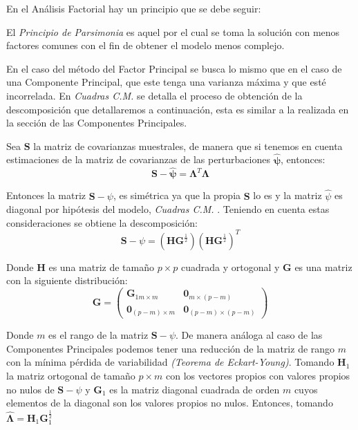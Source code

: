 \noindent En el Análisis Factorial hay un principio que se debe seguir:
\begin{defi}
El \emph{Principio de Parsimonia} es aquel por el cual se toma la solución con menos factores comunes con el fin de obtener el modelo menos complejo. 
\end{defi}

\noindent En el caso del método del Factor Principal se busca lo mismo que en el caso de una Componente Principal, que este tenga una varianza máxima y que esté incorrelada. En \emph{Cuadras C.M.}\cite{Cuadras 2014} se detalla el proceso de obtención de la descomposición que detallaremos a continuación, esta es similar a la realizada en la sección de las Componentes Principales. 

\noindent Sea $\mathbf{S}$ la matriz de covarianzas muestrales, de manera que si tenemos en cuenta estimaciones de la matriz de covarianzas de las perturbaciones $\mathbf{\hat{\psi}}$, entonces: 
\begin{equation}
\mathbf{S}-\mathbf{\hat{\psi}}=\mathbf{\Lambda}^T\mathbf{\Lambda}
\end{equation}

\noindent Entonces la matriz $\textbf{S}-\psi$, es simétrica ya que la propia $\textbf{S}$ lo es y la matriz $\hat{\psi}$ es diagonal por hipótesis del modelo, \emph{Cuadras C.M.} \cite{Cuadras 2014}. Teniendo en cuenta estas consideraciones se obtiene la descomposición:
\begin{equation}
\textbf{S}-\psi=(\textbf{HG}^{\frac{1}{2}})(\textbf{HG}^{\frac{1}{2}})^T
\end{equation}

\noindent Donde $\textbf{H}$ es una matriz de tamaño $p\times p$ cuadrada y ortogonal y $\textbf{G}$ es una matriz con la siguiente distribución:
\begin{equation}
\textbf{G}=\left(
\begin{matrix}
\textbf{G}_{1 m\times m} & \mathbf{0}_{m\times(p-m)}\\
\mathbf{0}_{(p-m)\times m} & \mathbf{0}_{(p-m)\times(p-m)}
\end{matrix}
\right)
\end{equation}

\noindent Donde $m$ es el rango de la matriz $\textbf{S}-\psi$. De manera análoga al caso de las Componentes Principales podemos tener una reducción de la matriz de rango $m$ con la mínima pérdida de variabilidad \emph{(Teorema de Eckart-Young)}. Tomando $\textbf{H}_1$ la matriz ortogonal de tamaño $p \times m$ con los vectores propios con valores propios no nulos de $\textbf{S}-\psi$ y $\textbf{G}_1$ es la matriz diagonal cuadrada de orden $m$ cuyos elementos de la diagonal son los valores propios no nulos. Entonces, tomando $\mathbf{\hat{\mathbf{\Lambda}}}=\textbf{H}_1\textbf{G}_1^{\frac{1}{2}}$ 

